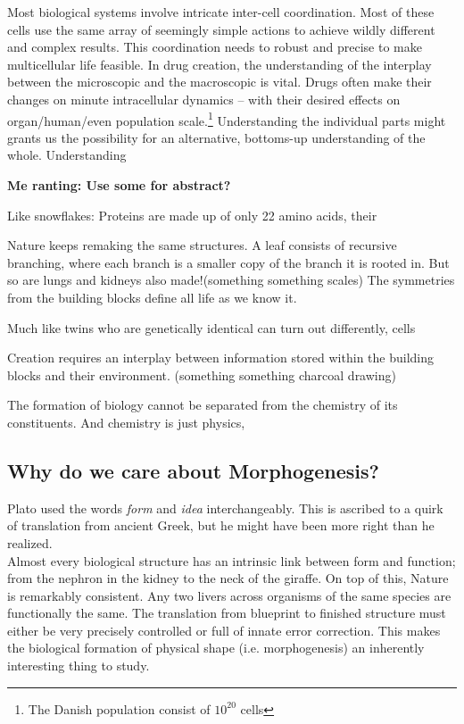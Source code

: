 
Most biological systems involve intricate inter-cell coordination. Most of these cells use the same array of seemingly simple actions to achieve wildly different and complex results. This coordination needs to robust and precise to make multicellular life feasible. In drug creation, the understanding of the interplay between the microscopic and the macroscopic is vital. Drugs often make their changes on minute intracellular dynamics -- with their desired effects on organ/human/even population scale.\footnote{The Danish population consist of $10^{20}$ cells}
Understanding the individual parts might grants us the possibility for an alternative, bottoms-up understanding of the whole. Understanding  


\textbf{Me ranting: Use some for abstract?}

Like snowflakes:
Proteins are made up of only 22 amino acids, their 

Nature keeps remaking the same structures. A leaf consists of recursive branching, where each branch is a smaller copy of the branch it is rooted in. But so are lungs and kidneys also made!(something something scales)  The symmetries from the building blocks define all life as we know it. 

Much like twins who are genetically identical can turn out differently, cells

Creation requires an interplay between information stored within the building blocks and their environment. (something something charcoal drawing)

The formation of biology cannot be separated from the chemistry of its constituents. And chemistry is just physics, 

\subsection{Why do we care about Morphogenesis?}
Plato used the words \textit{form} and \textit{idea} interchangeably. This is ascribed to a quirk of translation from ancient Greek, but he might have been more right than he realized.\\ Almost every biological structure has an intrinsic link between form and function; from the nephron in the kidney to the neck of the giraffe.  
On top of this, Nature is remarkably consistent. Any two livers across organisms of the same species are functionally the same. The translation from blueprint to finished structure must either be very precisely controlled or full of innate error correction. This makes the biological formation of physical shape (i.e. morphogenesis) an inherently interesting thing to study. 

